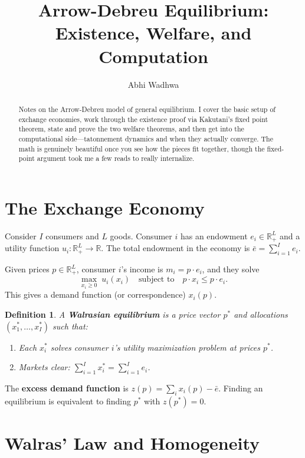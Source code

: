 \documentclass[11pt]{article}
\title{Arrow-Debreu Equilibrium: Existence, Welfare, and Computation}
\author{Abhi Wadhwa}
\date{}
\newtheorem{definition}{Definition}
\begin{document}
\maketitle

\begin{abstract}
Notes on the Arrow-Debreu model of general equilibrium. I cover the basic setup of exchange economies, work through the existence proof via Kakutani's fixed point theorem, state and prove the two welfare theorems, and then get into the computational side---tatonnement dynamics and when they actually converge. The math is genuinely beautiful once you see how the pieces fit together, though the fixed-point argument took me a few reads to really internalize.
\end{abstract}

\section{The Exchange Economy}

Consider $I$ consumers and $L$ goods. Consumer $i$ has an endowment $e_i \in \mathbb{R}^L_+$ and a utility function $u_i : \mathbb{R}^L_+ \to \mathbb{R}$. The total endowment in the economy is $\bar{e} = \sum_{i=1}^I e_i$.

Given prices $p \in \mathbb{R}^L_+$, consumer $i$'s income is $m_i = p \cdot e_i$, and they solve
\[
\max_{x_i \geq 0} \; u_i(x_i) \quad \text{subject to} \quad p \cdot x_i \leq p \cdot e_i.
\]
This gives a demand function (or correspondence) $x_i(p)$.

\begin{definition}
A \textbf{Walrasian equilibrium} is a price vector $p^*$ and allocations $(x_1^*, \ldots, x_I^*)$ such that:
\begin{enumerate}
\item Each $x_i^*$ solves consumer $i$'s utility maximization problem at prices $p^*$.
\item Markets clear: $\sum_{i=1}^I x_i^* = \sum_{i=1}^I e_i$.
\end{enumerate}
\end{definition}

The \textbf{excess demand function} is $z(p) = \sum_i x_i(p) - \bar{e}$. Finding an equilibrium is equivalent to finding $p^*$ with $z(p^*) = 0$.

\section{Walras' Law and Homogeneity}
\end{document}
